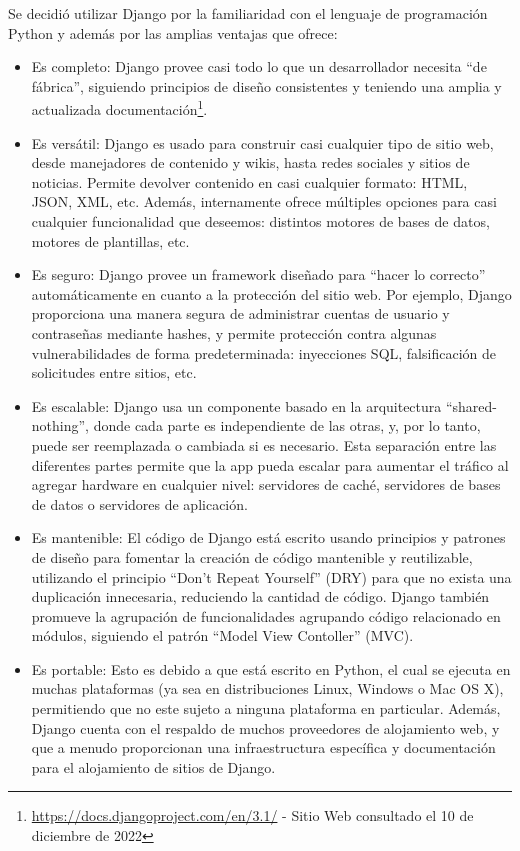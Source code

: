 \documentclass[12pt,a4paper]{article}
\begin{document}
\begin{sloppypar}
Se decidió utilizar Django por la familiaridad con el lenguaje de programación Python y además por las amplias ventajas que ofrece\cite{Mozila}: 
\begin{itemize}
\item Es completo: Django provee casi todo lo que un desarrollador necesita ``de fábrica'', siguiendo principios de diseño consistentes y teniendo una amplia y actualizada documentación\footnote{\url{https://docs.djangoproject.com/en/3.1/} - Sitio Web consultado el 10 de diciembre de 2022}.
\item Es versátil: Django es usado para construir casi cualquier tipo de sitio web, desde manejadores de contenido y wikis, hasta redes sociales y sitios de noticias. Permite devolver contenido en casi cualquier formato: HTML, JSON, XML, etc. Además, internamente ofrece múltiples opciones para casi cualquier funcionalidad que deseemos: distintos motores de bases de datos, motores de plantillas, etc. 
\item Es seguro: Django provee un framework diseñado para ``hacer lo correcto'' automáticamente en cuanto a la protección del sitio web. Por ejemplo, Django proporciona una manera segura de administrar cuentas de usuario y contraseñas mediante hashes, y permite protección contra algunas vulnerabilidades de forma predeterminada: inyecciones SQL, falsificación de solicitudes entre sitios, etc. 
\item Es escalable: Django usa un componente basado en la arquitectura ``shared-nothing'', donde cada parte es independiente de las otras, y, por lo tanto, puede ser reemplazada o cambiada si es necesario. Esta separación entre las diferentes partes permite que la app pueda escalar para aumentar el tráfico al agregar hardware en cualquier nivel: servidores de caché, servidores de bases de datos o servidores de aplicación.
\item Es mantenible: El código de Django está escrito usando principios y patrones de diseño para fomentar la creación de código mantenible y reutilizable, utilizando el principio ``Don't Repeat Yourself'' (DRY) para que no exista una duplicación innecesaria, reduciendo la cantidad de código. Django también promueve la agrupación de funcionalidades agrupando código relacionado en módulos, siguiendo el patrón ``Model View Contoller'' (MVC). 
\item Es portable: Esto es debido a que está escrito en Python, el cual se ejecuta en muchas plataformas (ya sea en distribuciones Linux, Windows o Mac OS X), permitiendo que no este sujeto a ninguna plataforma en particular. Además, Django cuenta con el respaldo de muchos proveedores de alojamiento web, y que a menudo proporcionan una infraestructura específica y documentación para el alojamiento de sitios de Django.\\
\end{itemize}


\end{sloppypar}
\end{document}
